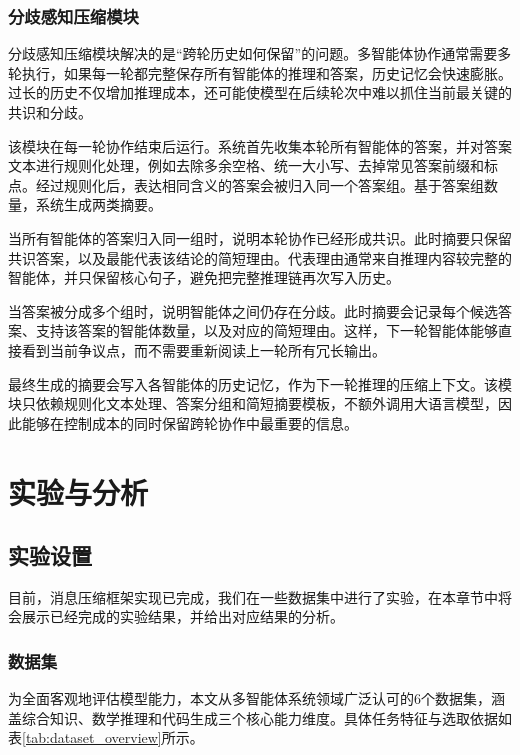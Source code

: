 \subsubsection{分歧感知压缩模块}

分歧感知压缩模块解决的是“跨轮历史如何保留”的问题。多智能体协作通常需要多轮执行，如果每一轮都完整保存所有智能体的推理和答案，历史记忆会快速膨胀。过长的历史不仅增加推理成本，还可能使模型在后续轮次中难以抓住当前最关键的共识和分歧。

该模块在每一轮协作结束后运行。系统首先收集本轮所有智能体的答案，并对答案文本进行规则化处理，例如去除多余空格、统一大小写、去掉常见答案前缀和标点。经过规则化后，表达相同含义的答案会被归入同一个答案组。基于答案组数量，系统生成两类摘要。

当所有智能体的答案归入同一组时，说明本轮协作已经形成共识。此时摘要只保留共识答案，以及最能代表该结论的简短理由。代表理由通常来自推理内容较完整的智能体，并只保留核心句子，避免把完整推理链再次写入历史。

当答案被分成多个组时，说明智能体之间仍存在分歧。此时摘要会记录每个候选答案、支持该答案的智能体数量，以及对应的简短理由。这样，下一轮智能体能够直接看到当前争议点，而不需要重新阅读上一轮所有冗长输出。

最终生成的摘要会写入各智能体的历史记忆，作为下一轮推理的压缩上下文。该模块只依赖规则化文本处理、答案分组和简短摘要模板，不额外调用大语言模型，因此能够在控制成本的同时保留跨轮协作中最重要的信息。


\section{实验与分析}
\subsection{实验设置}
目前，消息压缩框架实现已完成，我们在一些数据集中进行了实验，在本章节中将会展示已经完成的实验结果，并给出对应结果的分析。

\subsubsection{数据集}
为全面客观地评估模型能力，本文从多智能体系统领域广泛认可的6个数据集，涵盖综合知识、数学推理和代码生成三个核心能力维度。具体任务特征与选取依据如表\ref{tab:dataset_overview}所示。


